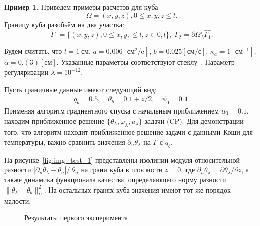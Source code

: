\textbf{Пример 1.}
Приведем примеры расчетов для куба
\[
    \Omega = {(x, y, z), 0 \leq x,y,z \leq l}.
\]
Границу куба разобьём на два участка:
\[
    \Gamma_1 = \{(x, y, z), 0 \leq x,y, \leq l, z \in 0, l\}, \;
    \Gamma_2 = \partial \Omega \setminus \hat{\Gamma_1}.
\]

Будем считать, что $l=1~\text{см}$, $a = 0.006[\text{см}^2/\text{c}]$,
$b=0.025[\text{см}/\text{с}]$,
$\kappa_a=1[\text{см}^{-1}]$, $\alpha = 0.(3)[\text{см}]$.
Указанные параметры соответствуют стеклу~\cite{Grenkin5}.
Параметр регуляризации $\lambda=10^{-12}$.

Пусть граничные данные имеют следующий вид:
\begin{gather*}
    q_b = 0.5, \quad
    \theta_b = 0.1 + z/2, \quad
    \psi_0 = 0.1.
\end{gather*}
Применяя алгоритм градиентного спуска с начальным приближением $u_0 = 0.1$,
находим приближенное решение $\{\theta_\lambda,\varphi_\lambda,u_\lambda\}$ задачи (CP)\@.
Для демонстрации того, что алгоритм находит приближенное решение задачи с данными
Коши для температуры, важно сравнить значения $\partial_n\theta_\lambda$ на $\Gamma$ с $q_b$.

На рисунке~\ref{fig:img_test_1} представлены изолинии модуля относительной разности
$|\partial_n\theta_\lambda-\theta_n|/\ \theta_n$
на грани куба в плоскости $z=0$, где
$\partial_n\theta_\lambda=\partial\theta_\lambda/\partial z$,
а также динамика функционала качества, определяющего
норму разности $\|\theta_\lambda -\theta_b\|^2_U$.
На остальных гранях куба значения имеют тот же порядок малости.

\begin{figure}[H]
    \centering
    \caption{Результаты первого эксперимента}
    \label{fig:1}
\end{figure}


